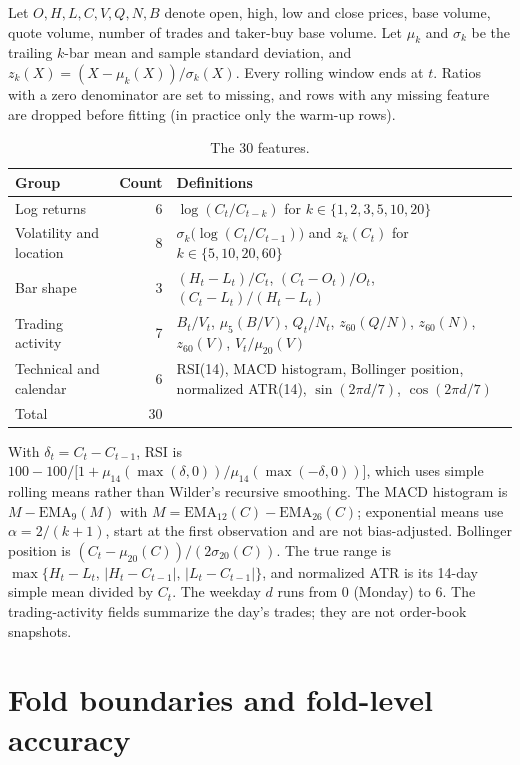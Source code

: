 \documentclass[preprint,12pt,authoryear,a4paper]{elsarticle}
\begin{document}
Let $O,H,L,C,V,Q,N,B$ denote open, high, low and close prices, base volume, quote
volume, number of trades and taker-buy base volume. Let $\mu_k$ and $\sigma_k$ be
the trailing $k$-bar mean and sample standard deviation, and
$z_k(X)=(X-\mu_k(X))/\sigma_k(X)$. Every rolling window ends at $t$. Ratios with a
zero denominator are set to missing, and rows with any missing feature are dropped
before fitting (in practice only the warm-up rows).

\begin{table}[H]\centering\small
\caption{The 30 features.}
\label{tab:features}
\begin{tabular}{@{}L{0.22\textwidth}rL{0.62\textwidth}@{}}
\toprule
Group & Count & Definitions \\
\midrule
Log returns & 6 & $\log(C_t/C_{t-k})$ for $k\in\{1,2,3,5,10,20\}$ \\
Volatility and location & 8 & $\sigma_k\bigl(\log(C_t/C_{t-1})\bigr)$ and $z_k(C_t)$ for $k\in\{5,10,20,60\}$ \\
Bar shape & 3 & $(H_t-L_t)/C_t$, $(C_t-O_t)/O_t$, $(C_t-L_t)/(H_t-L_t)$ \\
Trading activity & 7 & $B_t/V_t$, $\mu_5(B/V)$, $Q_t/N_t$, $z_{60}(Q/N)$, $z_{60}(N)$, $z_{60}(V)$, $V_t/\mu_{20}(V)$ \\
Technical and calendar & 6 & RSI(14), MACD histogram, Bollinger position, normalized ATR(14), $\sin(2\pi d/7)$, $\cos(2\pi d/7)$ \\
\midrule
Total & 30 & \\
\bottomrule
\end{tabular}
\end{table}

With $\delta_t=C_t-C_{t-1}$, RSI is
$100-100/\bigl[1+\mu_{14}(\max(\delta,0))/\mu_{14}(\max(-\delta,0))\bigr]$, which
uses simple rolling means rather than Wilder's recursive smoothing. The MACD
histogram is $M-\mathrm{EMA}_9(M)$ with $M=\mathrm{EMA}_{12}(C)-\mathrm{EMA}_{26}(C)$;
exponential means use $\alpha=2/(k+1)$, start at the first observation and are not
bias-adjusted. Bollinger position is $(C_t-\mu_{20}(C))/(2\sigma_{20}(C))$. The
true range is $\max\{H_t-L_t,\,|H_t-C_{t-1}|,\,|L_t-C_{t-1}|\}$, and normalized ATR
is its 14-day simple mean divided by $C_t$. The weekday $d$ runs from 0 (Monday) to
6. The trading-activity fields summarize the day's trades; they are not order-book
snapshots.

\section{Fold boundaries and fold-level accuracy}\label{app:folds}
\end{document}
